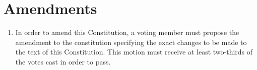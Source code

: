 \chapter{Amendments}

\begin{enumerate}[label=\Alph*.]
\item  In order to amend this Constitution, a voting member must propose the amendment to the constitution specifying the exact changes to be made to the text of this Constitution. This motion
must receive at least two-thirds of the votes cast in order to pass.
\end{enumerate}

